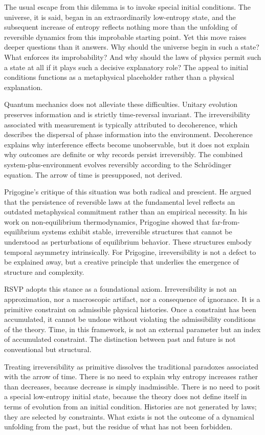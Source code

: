 \documentclass[11pt,oneside]{book}
\begin{document}
The usual escape from this dilemma is to invoke special initial conditions. The universe, it is said, began in an extraordinarily low-entropy state, and the subsequent increase of entropy reflects nothing more than the unfolding of reversible dynamics from this improbable starting point. Yet this move raises deeper questions than it answers. Why should the universe begin in such a state? What enforces its improbability? And why should the laws of physics permit such a state at all if it plays such a decisive explanatory role? The appeal to initial conditions functions as a metaphysical placeholder rather than a physical explanation.

Quantum mechanics does not alleviate these difficulties. Unitary evolution preserves information and is strictly time-reversal invariant. The irreversibility associated with measurement is typically attributed to decoherence, which describes the dispersal of phase information into the environment. Decoherence explains why interference effects become unobservable, but it does not explain why outcomes are definite or why records persist irreversibly. The combined system-plus-environment evolves reversibly according to the Schrödinger equation. The arrow of time is presupposed, not derived.

Prigogine’s critique of this situation was both radical and prescient. He argued that the persistence of reversible laws at the fundamental level reflects an outdated metaphysical commitment rather than an empirical necessity. In his work on non-equilibrium thermodynamics, Prigogine showed that far-from-equilibrium systems exhibit stable, irreversible structures that cannot be understood as perturbations of equilibrium behavior. These structures embody temporal asymmetry intrinsically. For Prigogine, irreversibility is not a defect to be explained away, but a creative principle that underlies the emergence of structure and complexity.

RSVP adopts this stance as a foundational axiom. Irreversibility is not an approximation, nor a macroscopic artifact, nor a consequence of ignorance. It is a primitive constraint on admissible physical histories. Once a constraint has been accumulated, it cannot be undone without violating the admissibility conditions of the theory. Time, in this framework, is not an external parameter but an index of accumulated constraint. The distinction between past and future is not conventional but structural.

Treating irreversibility as primitive dissolves the traditional paradoxes associated with the arrow of time. There is no need to explain why entropy increases rather than decreases, because decrease is simply inadmissible. There is no need to posit a special low-entropy initial state, because the theory does not define itself in terms of evolution from an initial condition. Histories are not generated by laws; they are selected by constraints. What exists is not the outcome of a dynamical unfolding from the past, but the residue of what has not been forbidden.
\end{document}
